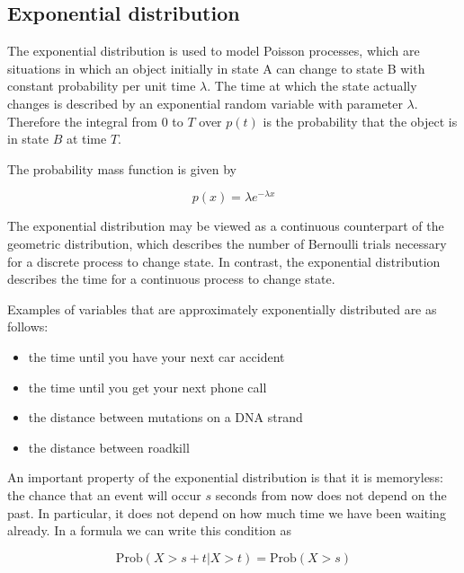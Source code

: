 \documentclass[justified, sixbynine]{tufte-book}
\theoremstyle{plain}%
\newtheorem * {corollary}{Corollary}
\theoremstyle{definition}
\theoremstyle{remark}
\newtheorem * {remark}{Remark}
\newtheorem * {note}{Note}
\begin{document}
\begin{fullwidth}
\goodbreak\subsection{Exponential distribution}

The exponential distribution is used to model Poisson processes, which are
situations in which an object initially in state A can change to state B
with constant probability per unit time $\lambda $. The time at which the
state actually changes is described by an exponential random variable with
parameter $\lambda $. Therefore the integral from $0$ to $T$ over $p(t)$ is
the probability that the object is in state $B$ at time $T$.

The probability mass function is given by

\begin{equation}
p(x)=\lambda e^{-\lambda x}
\end{equation}

The exponential distribution may be viewed as a continuous counterpart of
the geometric distribution, which describes the number of Bernoulli trials
necessary for a discrete process to change state. In contrast, the
exponential distribution describes the time for a continuous process to
change state.

Examples of variables that are approximately exponentially distributed are as follows:

\begin{itemize}
\item  the time until you have your next car accident

\item  the time until you get your next phone call

\item  the distance between mutations on a DNA strand

\item  the distance between roadkill
\end{itemize}

An important property of the exponential distribution is that it is
memoryless: the chance that an event will occur $s$ seconds from now does not depend on the past. In particular, it does not depend on how much time we have been waiting already. In a formula we can write this condition as

\begin{equation}
\textrm{Prob}(X>s+t|X>t)=\textrm{Prob}(X>s)
\end{equation}


\end{fullwidth}
\end{document}
